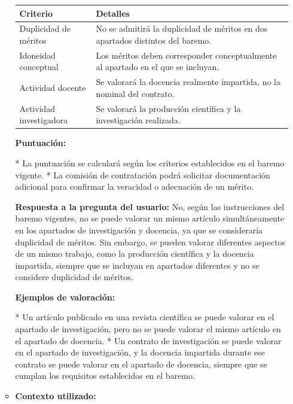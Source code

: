 \documentclass{article}
\begin{document}
\begin{itemize}
\begin{itemize}
                        \vspace{0.4cm}
                        \begin{table}[h!]\centering\renewcommand{\arraystretch}{1.3}
                              \begin{tabular}{|p{}|p{}|}\hline
                                    Criterio                & Detalles                                                                          \\\hline
                                    Duplicidad de méritos   & No se admitirá la duplicidad de méritos en dos apartados distintos del baremo.    \\\hline
                                    Idoneidad conceptual    & Los méritos deben corresponder conceptualmente al apartado en el que se incluyan. \\\hline
                                    Actividad docente       & Se valorará la docencia realmente impartida, no la nominal del contrato.          \\\hline
                                    Actividad investigadora & Se valorará la producción científica y la investigación realizada.                \\\hline
                              \end{tabular}\end{table}
                        \vspace{0.4cm}

                        \textbf{Puntuación:}

                        * La puntuación se calculará según los criterios establecidos en el baremo vigente.
                        * La comisión de contratación podrá solicitar documentación adicional para confirmar la veracidad o adecuación de un mérito.

                        \textbf{Respuesta a la pregunta del usuario:}
                        No, según las instrucciones del baremo vigentes, no se puede valorar un mismo artículo simultáneamente en los apartados de investigación y docencia, ya que se consideraría duplicidad de méritos. Sin embargo, se pueden valorar diferentes aspectos de un mismo trabajo, como la producción científica y la docencia impartida, siempre que se incluyan en apartados diferentes y no se considere duplicidad de méritos.

                        \textbf{Ejemplos de valoración:}

                        * Un artículo publicado en una revista científica se puede valorar en el apartado de investigación, pero no se puede valorar el mismo artículo en el apartado de docencia.
                        * Un contrato de investigación se puede valorar en el apartado de investigación, y la docencia impartida durante ese contrato se puede valorar en el apartado de docencia, siempre que se cumplan los requisitos establecidos en el baremo.
                  \item \textbf{Contexto utilizado:}


\end{itemize}
\end{itemize}
\end{document}
